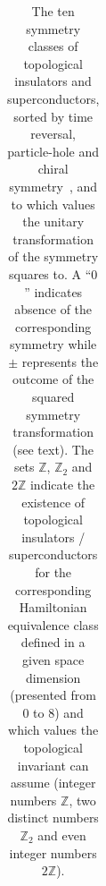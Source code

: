 \documentclass{svmono}
\begin{document}
\begin{table}
\begin{tabular}{l | c c c | l l l l l l l l l}
        \hline\hline
    \end{tabular}
    \addtolength{\tabcolsep}{-0.25cm}
    \caption{The ten symmetry classes of topological insulators and superconductors, sorted by time reversal, particle-hole and chiral symmetry~\cite{Altland1997}, and to which values the unitary transformation of the symmetry squares to. A ``$0$'' indicates absence of the corresponding symmetry while $\pm$ represents the outcome of the squared symmetry transformation (see text). The sets $\mathds Z$, $\mathds Z_2$ and $2\mathds Z$ indicate the existence of topological insulators / superconductors for the corresponding Hamiltonian equivalence class defined in a given space dimension (presented from $0$ to $8$) and which values the topological invariant can assume (integer numbers $\mathds Z$, two distinct numbers $\mathds Z_2$ and even integer numbers $2\mathds Z$).}
    \label{tab:symmetry_classes}
\end{table}
\end{document}
